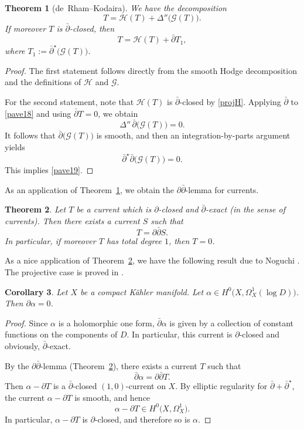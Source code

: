 \documentclass[english]{amsart}
\newcommand{\ddbar}{\partial\bar{\partial}}
\newcommand{\cH}{\mathcal{H}}
\newcommand{\cG}{\mathcal{G}}
\newcommand{\dbar}{\bar \partial}
\newtheorem{thm}{Theorem}[section]
\newtheorem{cor}[thm]{Corollary}
\numberwithin{equation}{thm}
\begin{document}
\begin{thm}[de~Rham--Kodaira]\label{decompcurrent}
	We have the decomposition
	\begin{equation}\label{pave18}
		T = \cH(T) + \Delta''\bigl(\cG(T)\bigr).
	\end{equation}
	If moreover $T$ is $\dbar$-closed, then
	\begin{equation}\label{pave19}
		T = \cH(T) + \dbar T_1,
	\end{equation}
	where $T_1 := \dbar^\star\bigl(\cG(T)\bigr)$.
\end{thm}

\begin{proof}
	The first statement follows directly from the smooth Hodge decomposition and the definitions of $\cH$ and $\cG$.
	
	For the second statement, note that $\cH(T)$ is $\dbar$-closed by \eqref{projH}. Applying $\dbar$ to \eqref{pave18} and using $\dbar T=0$, we obtain
	\[
	\Delta''\, \dbar\bigl(\cG(T)\bigr)=0.
	\]
	It follows that $\dbar\bigl(\cG(T)\bigr)$ is smooth, and then an integration-by-parts argument yields
	\[
	\dbar^\star \dbar\bigl(\cG(T)\bigr)=0.
	\]
	This implies \eqref{pave19}.
\end{proof}

As an application of Theorem~\ref{decompcurrent}, we obtain the $\ddbar$-lemma for currents.

\begin{thm}\label{ddbarcurrent}
	Let $T$ be a current which is $\partial$-closed and $\dbar$-exact (in the sense of currents). Then there exists a current $S$ such that
	\[
	T = \ddbar S.
	\]
	In particular, if moreover $T$ has total degree $1$, then $T=0$.
\end{thm}

As a nice application of Theorem~\ref{ddbarcurrent}, we have the following result due to Noguchi \cite{Nog95}. The projective case is proved in \cite{Del71}.

\begin{cor}\cite{Nog95}\label{Noglemma}
	Let $X$ be a compact K\"ahler manifold. Let $\alpha \in H^0\bigl(X,\Omega_X^1(\log D)\bigr)$. Then $\partial \alpha = 0$.
\end{cor}

\begin{proof}
	Since $\alpha$ is a holomorphic one form, 
	$\dbar \alpha$ is given by a collection of constant functions on the components of $D$. In particular, this current is $\partial$-closed
and obviously, $\dbar$-exact.
	
By the $\ddbar$-lemma (Theorem~\ref{ddbarcurrent}), there exists a current $T$ such that
	\[
	\dbar \alpha = \ddbar T.
	\]
	Then $\alpha - \partial T$ is a $\dbar$-closed $(1,0)$-current on $X$.
	By elliptic regularity for $\dbar+\dbar^\star$, the current $\alpha-\partial T$ is smooth, and hence
	\[
	\alpha-\partial T \in H^0\bigl(X,\Omega_X^1\bigr).
	\]
	In particular, $\alpha-\partial T$ is $\partial$-closed, and therefore so is $\alpha$.
\end{proof}
\end{document}
